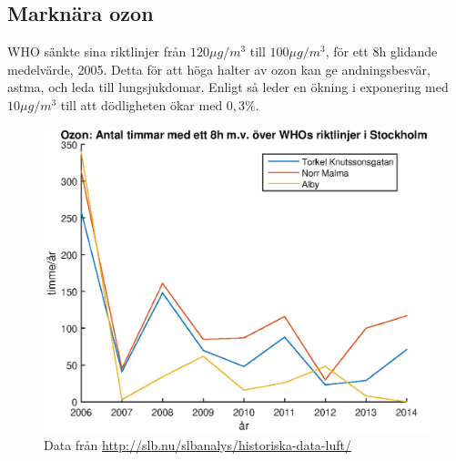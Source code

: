 \subsection{Marknära ozon}
WHO sänkte sina riktlinjer från $120 \mu g/m^3$ till $100 \mu g/m^3$, för ett 8h glidande medelvärde, 2005. Detta för att höga halter av ozon kan ge andningsbesvär, astma, och leda till lungsjukdomar. Enligt \textcite{whoAir} så leder en ökning i exponering med $10 \mu g/m^3$ till att dödligheten ökar med $0,3\%$.
\begin{figure}
	\centering
	\includegraphics[width=.8\textwidth]{Bilder/ozone}
	\caption{Data från \url{http://slb.nu/slbanalys/historiska-data-luft/}}
	\label{fig:Ozone}
\end{figure}
